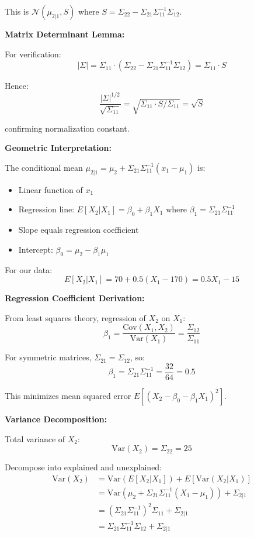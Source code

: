 \documentclass[12pt]{article}
\begin{document}
\begin{explanation}
This is $\mathcal{N}(\mu_{2|1}, S)$ where $S = \Sigma_{22} - \Sigma_{21}\Sigma_{11}^{-1}\Sigma_{12}$.

\textbf{Matrix Determinant Lemma:}

For verification:
\[
|\Sigma| = \Sigma_{11} \cdot (\Sigma_{22} - \Sigma_{21}\Sigma_{11}^{-1}\Sigma_{12}) = \Sigma_{11} \cdot S
\]

Hence:
\[
\frac{|\Sigma|^{1/2}}{\sqrt{\Sigma_{11}}} = \sqrt{\Sigma_{11} \cdot S / \Sigma_{11}} = \sqrt{S}
\]

confirming normalization constant.

\textbf{Geometric Interpretation:}

The conditional mean $\mu_{2|1} = \mu_2 + \Sigma_{21}\Sigma_{11}^{-1}(x_1 - \mu_1)$ is:
\begin{itemize}
    \item Linear function of $x_1$
    \item Regression line: $E[X_2 | X_1] = \beta_0 + \beta_1 X_1$ where $\beta_1 = \Sigma_{21}\Sigma_{11}^{-1}$
    \item Slope equals regression coefficient
    \item Intercept: $\beta_0 = \mu_2 - \beta_1\mu_1$
\end{itemize}

For our data:
\[
E[X_2 | X_1] = 70 + 0.5(X_1 - 170) = 0.5X_1 - 15
\]

\textbf{Regression Coefficient Derivation:}

From least squares theory, regression of $X_2$ on $X_1$:
\[
\beta_1 = \frac{\text{Cov}(X_1, X_2)}{\text{Var}(X_1)} = \frac{\Sigma_{12}}{\Sigma_{11}}
\]

For symmetric matrices, $\Sigma_{21} = \Sigma_{12}$, so:
\[
\beta_1 = \Sigma_{21}\Sigma_{11}^{-1} = \frac{32}{64} = 0.5
\]

This minimizes mean squared error $E[(X_2 - \beta_0 - \beta_1X_1)^2]$.

\textbf{Variance Decomposition:}

Total variance of $X_2$:
\[
\text{Var}(X_2) = \Sigma_{22} = 25
\]

Decompose into explained and unexplained:
\begin{align*}
\text{Var}(X_2) &= \text{Var}(E[X_2|X_1]) + E[\text{Var}(X_2|X_1)] \\
&= \text{Var}(\mu_2 + \Sigma_{21}\Sigma_{11}^{-1}(X_1 - \mu_1)) + \Sigma_{2|1} \\
&= (\Sigma_{21}\Sigma_{11}^{-1})^2\Sigma_{11} + \Sigma_{2|1} \\
&= \Sigma_{21}\Sigma_{11}^{-1}\Sigma_{12} + \Sigma_{2|1}
\end{align*}


\end{explanation}
\end{document}
